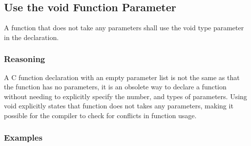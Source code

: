 \subsection{Use the void Function Parameter}

A function that does not take any parameters shall use the void type parameter in the declaration.

\subsubsection{Reasoning}

A C function declaration with an empty parameter list is not the same as that the function has no parameters, it is an obsolete way to declare a function without needing to explicitly specify the number, and types of parameters. Using void explicitly states that function does not takes any parameters, making it possible for the compiler to check for conflicts in function usage.

\subsubsection{Examples}

